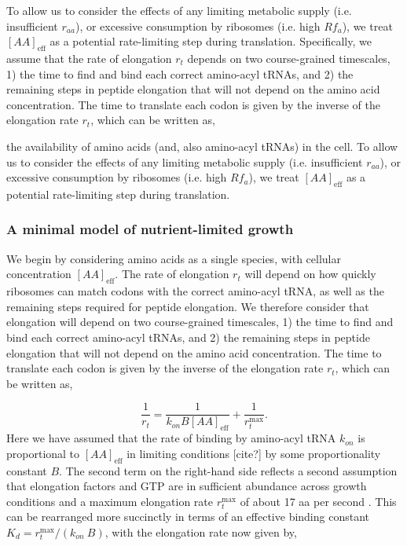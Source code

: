 To allow us to consider the effects of
any limiting metabolic supply (i.e. insufficient $r_{aa}$), or excessive
consumption by ribosomes (i.e. high $R f_a$), we treat $[AA]_{\text{eff}}$ as
a potential rate-limiting step during translation. Specifically, we assume that
the rate of elongation $r_t$ depends on two course-grained timescales, 1) the
time to find and bind each correct amino-acyl tRNAs, and 2) the remaining steps
in peptide elongation that will not depend on the amino acid concentration. The
time to translate each codon is given by the inverse of the elongation rate
$r_t$, which can be written as,


the availability of amino acids
(and, also amino-acyl tRNAs) in the cell. To allow us to consider the effects of
any limiting metabolic supply (i.e. insufficient $r_{aa}$), or excessive
consumption by ribosomes (i.e. high $R f_a$), we treat $[AA]_{\text{eff}}$ as
a potential rate-limiting step during translation.

\subsubsection{A minimal model of nutrient-limited growth}

We begin by considering amino acids as a
single species, with cellular concentration $[AA]_{\text{eff}}$.
The rate of elongation $r_t$ will depend on how quickly ribosomes can
match codons with the correct amino-acyl tRNA, as well as the remaining steps
required for peptide elongation.
We therefore consider that elongation will depend on two course-grained timescales, 1) the
time to find and bind each correct amino-acyl tRNAs, and 2) the remaining steps
in peptide elongation that will not depend on the amino acid concentration. The
time to translate each codon is given by the inverse of the elongation rate
$r_t$, which can be written as,

\begin{equation}
\frac{1}{r_t} = \frac{1}{k_{on} B [AA]_{\text{eff}}} + \frac{1}{r_{t}^{\text{max}}}.
\end{equation}
Here we have assumed that the rate of binding by amino-acyl tRNA $k_{on}$ is
proportional to $[AA]_{\text{eff}}$ in limiting conditions [cite?] by some
proportionality constant $B$. The second term on the right-hand side reflects a second
assumption that elongation factors and GTP are in sufficient abundance across
growth conditions and a maximum elongation rate $r_{t}^{\text{max}}$
of about 17 aa per second \cite{dai2016}. This can be rearranged more succinctly in
terms of an effective binding constant $K_d = r_{t}^{\text{max}}/ (k_{on} \ B)$, with
the elongation rate now given by,

